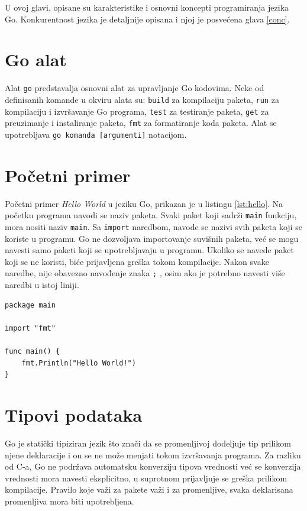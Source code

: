\documentclass[12pt,oneside]{memoir}
\begin{document}
U ovoj glavi, opisane su karakteristike i osnovni koncepti programiranja jezika Go.  Konkurentnost jezika je detaljnije opisana i njoj je posvećena glava \ref{conc}.

\section{Go alat}

Alat \texttt{go} predstavalja osnovni alat za upravljanje Go kodovima. Neke od definisanih komande u okviru alata su: \texttt{build} za kompilaciju paketa, \texttt{run} za kompilaciju i izvršavanje Go programa, \texttt{test} za testiranje paketa, \texttt{get} za preuzimanje i instaliranje paketa, \texttt{fmt} za formatiranje koda paketa. Alat se upotrebljava \texttt{go komanda [argumenti]} notacijom.

\section{Početni primer}

Početni primer \textit{Hello World} u jeziku Go, prikazan je u listingu \ref{lst:hello}. Na početku programa navodi se naziv paketa. Svaki paket koji sadrži \texttt{main} funkciju, mora nositi naziv \texttt{main}. Sa \texttt{import} naredbom, navode se nazivi svih paketa koji se koriste u programu. Go ne dozvoljava importovanje suvišnih paketa, već se mogu navesti samo paketi koji se upotrebljavaju u programu. Ukoliko se navede paket koji se ne koristi, biće prijavljena greška tokom kompilacije. Nakon svake naredbe, nije obavezno navođenje znaka \texttt{;} , osim ako je potrebno navesti više naredbi u istoj liniji. 

\begin{center}
\begin{lstlisting}[caption=Program \textit{Hello World} u jeziku Go,label={lst:hello},  backgroundcolor=\color{background}]
package main

import "fmt"

func main() {
	fmt.Println("Hello World!")
}
\end{lstlisting}
\end{center}

\section{Tipovi podataka}

Go je statički tipiziran jezik što znači da se promenljivoj dodeljuje tip prilikom njene deklaracije i on se ne može menjati tokom izvršavanja programa. Za razliku od C-a, Go ne podržava automatsku konverziju tipova vrednosti već se konverzija vrednosti mora navesti eksplicitno, u suprotnom prijavljuje se greška prilikom kompilacije. Pravilo koje važi za pakete važi i za promenljive, svaka deklarisana promenljiva mora biti upotrebljena.
\end{document}
